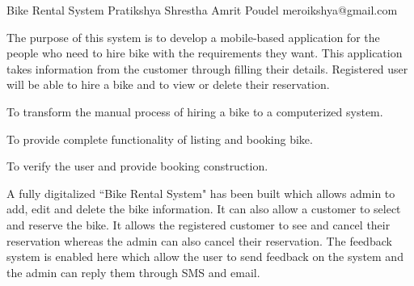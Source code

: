  \begin{conf-abstract}[]
 {Bike Rental System}
 {Pratikshya Shrestha 
 	 Amrit Poudel
 }
{meroikshya@gmail.com}

The purpose of this system is to develop a mobile-based application for the people who need to hire bike with the requirements they want.
This application takes information from the customer through filling their details.
Registered user will be able to hire a bike and to view or delete their reservation.

To transform the manual process of hiring a bike to a computerized system.

To provide complete functionality of listing and booking bike.

To verify the user and provide booking construction.


A fully digitalized ``Bike Rental System" has been built which allows admin to add, edit and delete the bike information. 
It can also allow a customer to select and reserve the bike. 
It allows the registered customer to see and cancel their reservation whereas the admin can also cancel their reservation.
The feedback system is enabled here which allow the user to send feedback on the system and the admin can reply them through SMS and email.

 \end{conf-abstract}
